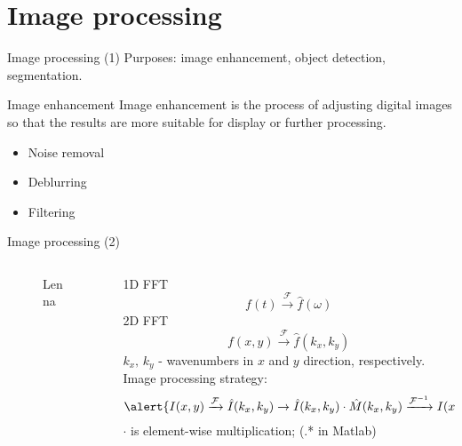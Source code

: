 \documentclass[10pt,aspectratio=169,notes]{beamer} %
\begin{document}
\section{Image processing}
\begin{frame}{Image processing (1)}
Purposes: image enhancement, object detection, segmentation.
\begin{block}{Image enhancement}
	Image enhancement is the process of adjusting digital images so that the results are more suitable for display or further processing.
\end{block}
	\begin{itemize}
		\item Noise removal
		\item Deblurring 
		\item Filtering
	\end{itemize}
\end{frame}
\begin{frame}{Image processing (2)}
\begin{columns}[T]
	\begin{column}{0.4\textwidth}
		\begin{figure}
			\caption{Lenna}
		\end{figure}
	\end{column}
	\begin{column}{0.6\textwidth}
	1D FFT
	\begin{equation*}
		f(t) \xrightarrow{\mathcal{F}} \hat{f}(\omega)
	\end{equation*}
	2D FFT
	\begin{equation*}
		f(x,y) \xrightarrow{\mathcal{F}} \hat{f}(k_x,k_y)
	\end{equation*}
	\(k_x,\, k_y\) - wavenumbers in \(x\) and \(y\) direction, respectively.\\
	Image processing strategy:
	\begin{equation*}
	\alert{I(x,y) \xrightarrow{\mathcal{F}} \hat{I}(k_x,k_y) \rightarrow \hat{I}(k_x,k_y) \cdot \hat{M}(k_x,k_y)  \xrightarrow{\mathcal{F}^{-1}}  I(x,y)}
	\end{equation*}
	\(\cdot\) is element-wise multiplication; (.* in Matlab)
	\end{column}
	\end{columns}
\end{frame}
\end{document}
